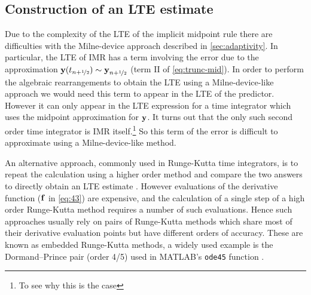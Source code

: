 \subsection{Construction of an LTE estimate}

Due to the complexity of the LTE of the implicit midpoint rule there are difficulties with the Milne-device approach described in \cref{sec:adaptivity}.
In particular, the LTE of IMR has a term involving the error due to the approximation $\boldsymbol{\mathrm{y}}(t_{n+\nicefrac{1}{2}}) \sim \boldsymbol{\mathrm{y}}_{n+\nicefrac{1}{2}}$ (term II of \cref{eq:trunc-mid}).
In order to perform the algebraic rearrangements to obtain the LTE using a Milne-device-like approach we would need this term to appear in the LTE of the predictor.
However it can only appear in the LTE expression for a time integrator which uses the midpoint approximation for $\boldsymbol{\mathrm{y}}$.
It turns out that the only such second order time integrator is IMR itself.\footnote{To see why this is the case }
So this term of the error is difficult to approximate using a Milne-device-like method.

An alternative approach, commonly used in Runge-Kutta time integrators, is to repeat the calculation using a higher order method and compare the two answers to directly obtain an LTE estimate \cite[165]{HairerWanner}.
However evaluations of the derivative function (${\boldsymbol{\mathrm{f}}}$ in \cref{eq:43}) are expensive, and the calculation of a single step of a high order Runge-Kutta method requires a number of such evaluations.
Hence such approaches usually rely on pairs of Runge-Kutta methods which share most of their derivative evaluation points but have different orders of accuracy.
These are known as embedded Runge-Kutta methods, a widely used example is the Dormand–Prince pair (order 4/5) used in MATLAB's \texttt{ode45} function \cite{matlab-ode45}.

